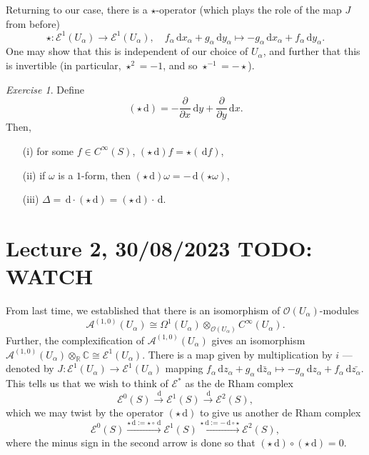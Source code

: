 \documentclass[a4paper]{report}
\theoremstyle{definition}
\theoremstyle{remark}
\theoremstyle{proposition}
\theoremstyle{conjecture}
\theoremstyle{lemma}
\theoremstyle{corollary}
\theoremstyle{exercise}
\newtheorem{exercise}{Exercise}
\theoremstyle{example}
\newcommand{\C}{\mathbb{C}}
\newcommand{\mcal}{\mathcal}
\newcommand{\diff}{\,\mathrm{d}}
\begin{document}
Returning to our case, there is a $\star$-operator (which plays the role of the 
map $J$ from before) 
$$\star : \mcal{E}^1(U_\alpha) \longrightarrow \mcal{E}^1(U_\alpha) ,\quad f_\alpha \diff x_\alpha + g_\alpha\diff y_\alpha \longmapsto -g_\alpha\diff x_\alpha + f_\alpha \diff y_\alpha.$$
One may show that this is independent of our choice of $U_\alpha$, and further
that this is invertible (in particular, $\star^2 = -1$, and so 
$\star^{-1} = -\star$).

\begin{exercise}\label{ex_ex8}
    Define $$(\star \diff) = -\frac{\partial}{\partial x} \diff y + \frac{\partial}{\partial y} \diff x.$$
        Then,
        \begin{itemize}
            \item[(i)] for some $f\in C^\infty(S)$, $(\star \diff)f = \star (\diff f)$,
            \item[(ii)] if $\omega$ is a $1$-form, then 
                $(\star \diff )\omega = -\diff (\star\omega)$,
            \item[(iii)] $\Delta = \diff \cdot(\star \diff) = (\star \diff)\cdot \diff$.
            \end{itemize}
\end{exercise}

\section{Lecture 2, 30/08/2023 TODO: WATCH}

From last time, we established that there is an isomorphism of 
$\mcal{O}(U_\alpha)$-modules
$$\mcal{A}^{(1,0)}(U_\alpha) \cong \Omega^1(U_\alpha) \otimes_{\mcal{O}(U_\alpha)}C^\infty(U_\alpha).$$
Further, the complexification of $\mcal{A}^{(1,0)}(U_\alpha)$ gives an 
isomorphism 
$\mcal{A}^{(1,0)}(U_\alpha)\otimes_{\mathbb{R}}\C \cong \mcal{E}^1(U_\alpha)$.
There is a map given by multiplication by $i$ --- denoted by $J : \mcal{E}^1(U_\alpha)\to\mcal{E}^1(U_\alpha)$ mapping 
$f_\alpha \diff z_\alpha + g_\alpha \diff \bar{z}_\alpha \mapsto -g_\alpha \diff z_\alpha + f_\alpha \diff \bar{z_\alpha}$.
This tells us that we wish to think of $\mcal{E}^\ast$ as the de Rham 
complex 
$$\mcal{E}^0(S) \stackrel{\diff}{\longrightarrow} \mcal{E}^1(S)\stackrel{\diff}{\longrightarrow}\mcal{E}^2(S),$$
which we may twist by the operator $(\star\diff)$ to give us another 
de Rham complex
$$\mcal{E}^0(S) \stackrel{\star\diff:=\star \circ \diff}{\longrightarrow} \mcal{E}^1(S)\stackrel{\star\diff:=-\diff\circ\star}{\longrightarrow}\mcal{E}^2(S),$$
where the minus sign in the second arrow is done so that 
$(\star \diff)\circ (\star \diff) = 0$.
\end{document}
